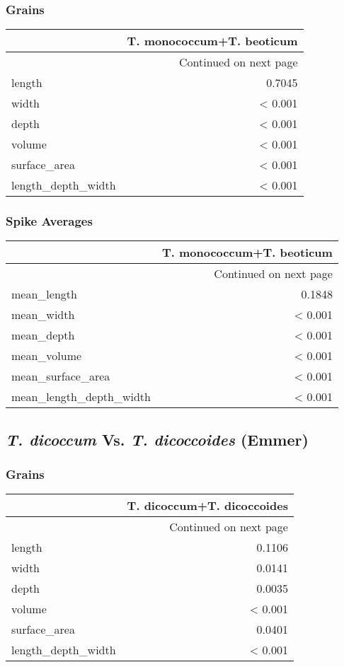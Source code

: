 \documentclass[a4paper]{article}
\begin{document}
\subsubsection*{Grains}
\label{sec-3-1-1}
\begin{longtable}{p{5cm}|r}
 & T. monococcum+T. beoticum\\
\hline
\endhead
\hline\multicolumn{2}{r}{Continued on next page} \\
\endfoot
\endlastfoot
length & 0.7045\\
width & < 0.001\\
depth & < 0.001\\
volume & < 0.001\\
surface\_area & < 0.001\\
length\_depth\_width & < 0.001\\
\end{longtable}



\subsubsection*{Spike Averages}
\label{sec-3-1-2}
\begin{longtable}{p{5cm}|r}
 & T. monococcum+T. beoticum\\
\hline
\endhead
\hline\multicolumn{2}{r}{Continued on next page} \\
\endfoot
\endlastfoot
mean\_length & 0.1848\\
mean\_width & < 0.001\\
mean\_depth & < 0.001\\
mean\_volume & < 0.001\\
mean\_surface\_area & < 0.001\\
mean\_length\_depth\_width & < 0.001\\
\end{longtable}


\clearpage
\subsection*{\emph{T. dicoccum} Vs. \emph{T. dicoccoides} (Emmer)}
\label{sec-3-2}

\subsubsection*{Grains}
\label{sec-3-2-1}
\begin{longtable}{p{5cm}|r}
 & T. dicoccum+T. dicoccoides\\
\hline
\endhead
\hline\multicolumn{2}{r}{Continued on next page} \\
\endfoot
\endlastfoot
length & 0.1106\\
width & 0.0141\\
depth & 0.0035\\
volume & < 0.001\\
surface\_area & 0.0401\\
length\_depth\_width & < 0.001\\
\end{longtable}
\end{document}
